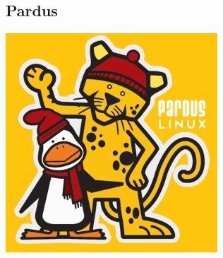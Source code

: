 \documentclass{beamer}
\begin{document}
	\subsection{Pardus}
	\begin{frame}
	 \includegraphics{pardus.jpg}
	\end{frame}
\end{document}
